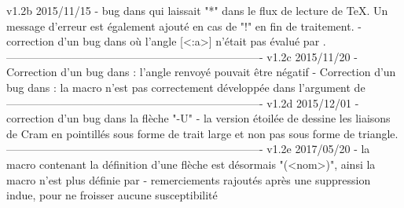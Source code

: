 v1.2b      2015/11/15
    - bug dans \CF@seek@submol qui laissait "*" dans le flux de
      lecture de TeX. Un message d'erreur est \'egalement ajout\'e
      en cas de "!" en fin de traitement.
    - correction d'un bug dans \CF@set@bondangle o\`u l'angle [<:a>]
      n'\'etait pas \'evalu\'e par \pgfmathsetmacro.
----------------------------------------------------------------------
v1.2c      2015/11/20
    - Correction d'un bug dans \CF@set@bondangle : l'angle renvoy\'e
      pouvait \^etre n\'egatif
    - Correction d'un bug dans \CF@direct@arrow : la macro \CF@ifempty
      n'est pas correctement d\'evelopp\'ee dans l'argument de
      \pgfpointanchor
----------------------------------------------------------------------
v1.2d      2015/12/01
    - correction d'un bug dans la fl\`eche "-U"
    - la version \'etoil\'ee de \setcrambond dessine les liaisons de
      Cram en pointill\'es sous forme de trait large et non pas sous
      forme de triangle.
----------------------------------------------------------------------
v1.2e      2017/05/20
    - la macro contenant la d\'efinition d'une fl\`eche est
      d\'esormais "\CF@arrow(<nom>)", ainsi la macro \0 n'est plus
      d\'efinie par 
    - remerciements rajout\'es apr\`es une suppression indue, pour ne
      froisser aucune susceptibilit\'e